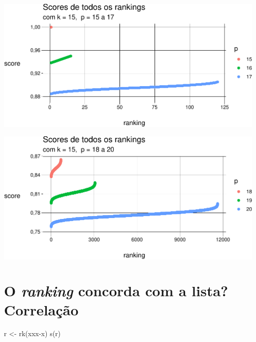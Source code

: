 \documentclass[
  letterpaper,
  DIV=11,
  numbers=noendperiod]{scrreprt}
\newenvironment{Shaded}{\begin{snugshade}}{\end{snugshade}}
\newcommand{\FunctionTok}[1]{\textcolor[rgb]{0.28,0.35,0.67}{#1}}
\newcommand{\NormalTok}[1]{\textcolor[rgb]{0.00,0.23,0.31}{#1}}
\newcommand{\OtherTok}[1]{\textcolor[rgb]{0.00,0.23,0.31}{#1}}
\newcommand{\StringTok}[1]{\textcolor[rgb]{0.13,0.47,0.30}{#1}}
\begin{document}
\begin{center}
\includegraphics[width=1\textwidth,height=\textheight]{usando-posicoes_files/figure-pdf/unnamed-chunk-8-1.pdf}
\end{center}

\begin{center}
\includegraphics[width=1\textwidth,height=\textheight]{usando-posicoes_files/figure-pdf/unnamed-chunk-9-1.pdf}
\end{center}


\chapter{\texorpdfstring{O \emph{ranking} concorda com a lista?
Correlação}{O ranking concorda com a lista? Correlação}}\label{o-ranking-concorda-com-a-lista-correlauxe7uxe3o}

\begin{Shaded}
\begin{Highlighting}[]
\NormalTok{r }\OtherTok{\textless{}{-}} \FunctionTok{rk}\NormalTok{(}\StringTok{\textquotesingle{}xxx{-}x\textquotesingle{}}\NormalTok{)}
\FunctionTok{s}\NormalTok{(r)}
\end{Highlighting}
\end{Shaded}
\end{document}
